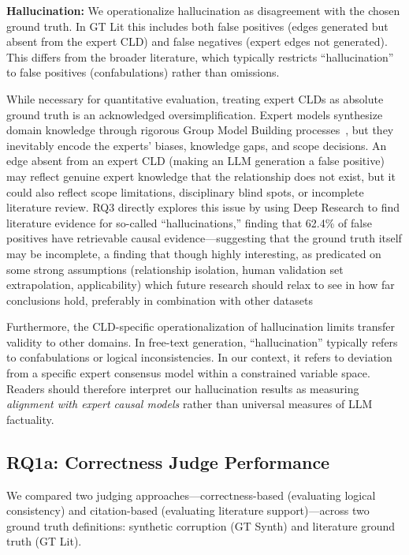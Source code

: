 \textbf{Hallucination:} We operationalize hallucination as disagreement with the chosen ground truth. In GT Lit this includes both false positives (edges generated but absent from the expert CLD) and false negatives (expert edges not generated). This differs from the broader literature, which typically restricts ``hallucination'' to false positives (confabulations) rather than omissions.

While necessary for quantitative evaluation, treating expert CLDs as absolute ground truth is an acknowledged oversimplification. Expert models synthesize domain knowledge through rigorous Group Model Building processes~\citep{crielaard2024refining}, but they inevitably encode the experts' biases, knowledge gaps, and scope decisions. An edge absent from an expert CLD (making an LLM generation a false positive) may reflect genuine expert knowledge that the relationship does not exist, but it could also reflect scope limitations, disciplinary blind spots, or incomplete literature review. RQ3 directly explores this issue by using Deep Research to find literature evidence for so-called ``hallucinations,'' finding that 62.4\% of false positives have retrievable causal evidence---suggesting that the ground truth itself may be incomplete, a finding that though highly interesting, as predicated on some strong assumptions (relationship isolation, human validation set extrapolation, applicability) which future research should relax to see in how far conclusions hold, preferably in combination with other datasets

Furthermore, the CLD-specific operationalization of hallucination limits transfer validity to other domains. In free-text generation, ``hallucination'' typically refers to confabulations or logical inconsistencies. In our context, it refers to deviation from a specific expert consensus model within a constrained variable space. Readers should therefore interpret our hallucination results as measuring \textit{alignment with expert causal models} rather than universal measures of LLM factuality.

\subsection{RQ1a: Correctness Judge Performance}
\label{sec:discussion_rq1a_correctness}

We compared two judging approaches---correctness-based (evaluating logical consistency) and citation-based (evaluating literature support)---across two ground truth definitions: synthetic corruption (GT Synth) and literature ground truth (GT Lit).

